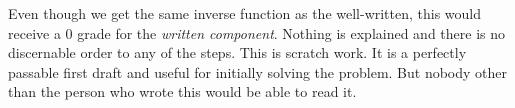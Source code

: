 \documentclass{amsart}
\begin{document}
\noindent
Even though we get the same inverse function as the
well-written, this would receive a 0 grade for the
\emph{written component}.  Nothing is explained and there is
no discernable order to any of the steps. This is scratch
work. It is a perfectly passable first draft and useful for
initially solving the problem. But nobody other than the
person who wrote this would be able to read it.
\end{document}

